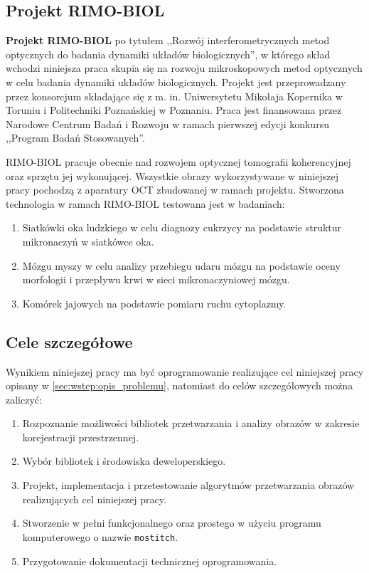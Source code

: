 \subsection{Projekt RIMO-BIOL}
\label{sec:wstep:rimo-biol}

\textbf{Projekt RIMO-BIOL} po tytułem ,,Rozwój interferometrycznych metod optycznych do badania dynamiki układów biologicznych'', w którego skład wchodzi niniejsza praca skupia się na rozwoju mikroskopowych metod optycznych w celu badania dynamiki układów biologicznych. Projekt jest przeprowadzany przez konsorcjum składające się z m. in. Uniwersytetu Mikołaja Kopernika w Toruniu i Politechniki Poznańskiej w Poznaniu. Praca jest finansowana przez Narodowe Centrum Badań i Rozwoju w ramach pierwszej edycji konkursu ,,Program Badań Stosowanych''.

RIMO-BIOL pracuje obecnie nad rozwojem optycznej tomografii koherencyjnej oraz sprzętu jej wykonującej. Wszystkie obrazy wykorzystywane w niniejszej pracy pochodzą z aparatury OCT zbudowanej w ramach projektu. Stworzona technologia w ramach RIMO-BIOL testowana jest w  badaniach:

\begin{enumerate}
\item Siatkówki oka ludzkiego w celu diagnozy cukrzycy na podstawie struktur mikronaczyń w siatkówce oka.
\item Mózgu myszy w celu analizy przebiegu udaru mózgu na podstawie oceny morfologii i przepływu krwi w sieci mikronaczyniowej mózgu.
\item Komórek jajowych na podstawie pomiaru ruchu cytoplazmy.
\end{enumerate}

\subsection{Cele szczegółowe}
\label{sec:wstep:cele_szczegolowe}

Wynikiem niniejszej pracy ma być oprogramowanie realizujące cel niniejszej pracy opisany w \ref{sec:wstep:opis_problemu}, natomiast do celów szczegółowych można zaliczyć:

\begin{enumerate}
\item Rozpoznanie możliwości bibliotek przetwarzania i analizy obrazów w zakresie korejestracji przestrzennej.
\item Wybór bibliotek i środowiska deweloperskiego.
\item Projekt, implementacja i przetestowanie algorytmów przetwarzania obrazów realizujących cel niniejszej pracy.
\item Stworzenie w pełni funkcjonalnego oraz prostego w użyciu programu komputerowego o nazwie \texttt{mostitch}.
\item Przygotowanie dokumentacji technicznej oprogramowania.
\end{enumerate}

